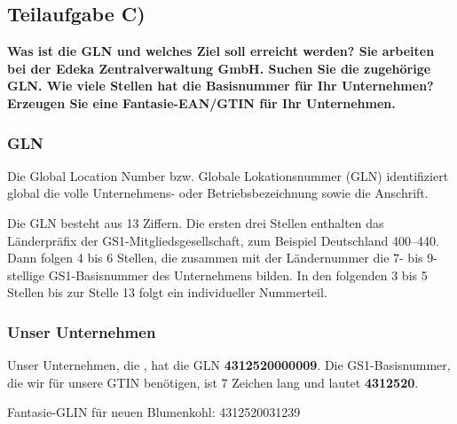 \begin{center}
\end{center}


\subsection{Teilaufgabe C)}
\textbf{Was ist die GLN und welches Ziel soll erreicht werden? Sie arbeiten bei der Edeka
Zentralverwaltung GmbH. Suchen Sie die zugehörige GLN. Wie viele Stellen hat die
Basisnummer für Ihr Unternehmen? Erzeugen Sie eine Fantasie-EAN/GTIN für Ihr
Unternehmen.}

\subsubsection{GLN}
Die Global Location Number bzw. Globale Lokationsnummer (GLN) identifiziert
global die volle Unternehmens- oder Betriebsbezeichnung sowie die Anschrift. 

Die GLN besteht aus 13 Ziffern. Die ersten drei Stellen enthalten das
Länderpräfix der GS1-Mitgliedsgesellschaft, zum Beispiel Deutschland 400–440.
Dann folgen 4 bis 6 Stellen, die zusammen mit der Ländernummer die 7- bis
9-stellige GS1-Basisnummer des Unternehmens bilden. In den folgenden 3 bis 5
Stellen bis zur Stelle 13 folgt ein individueller Nummerteil.

\subsubsection{Unser Unternehmen}
Unser Unternehmen, die , hat die GLN
\textbf{4312520000009}. Die GS1-Basisnummer, die wir für unsere GTIN benötigen,
ist 7 Zeichen lang und lautet \textbf{4312520}.

Fantasie-GLIN für neuen Blumenkohl: 4312520031239

\clearpage 